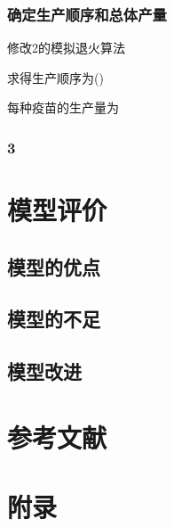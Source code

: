 \documentclass[UTF8]{ctexart}
\begin{document}
	\subsubsection{确定生产顺序和总体产量}
	修改2的模拟退火算法
	\par 求得生产顺序为()
	\par 每种疫苗的生产量为
	
	\subsubsection{3}
	
	\section{模型评价}
	\subsection{模型的优点}
	\subsection{模型的不足}
	\subsection{模型改进}
	
	\section{参考文献}
	
	\section{附录}
	\begin{appendices}
		
	\end{appendices}
	
\end{document}
